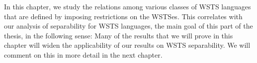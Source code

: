 \documentclass[../../diss.tex]{subfiles}
\begin{document}
In this chapter, we study the relations among various classes of WSTS languages that are defined by imposing restrictions on the WSTSes.
This correlates with our analysis of separability for WSTS languages, the main goal of this part of the thesis, in the following sense: Many of the results that we will prove in this chapter will widen the applicability of our results on WSTS separability.
We will comment on this in more detail in the next chapter.
\end{document}
